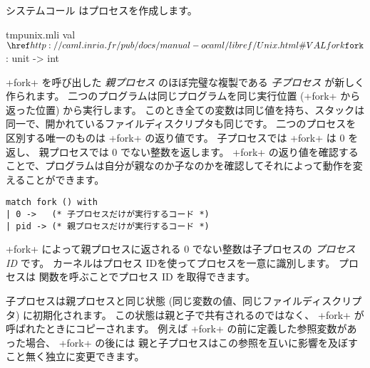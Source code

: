 システムコール  はプロセスを作成します。
%
\begin{listingcodefile}{tmpunix.mli}
val $\libvalue{Unix}{fork}$ : unit -> int
\end{listingcodefile}
%
\ml+fork+ を呼び出した \emph{親プロセス} のほぼ完璧な複製である \emph{子プロセス}
が新しく作られます。
二つのプログラムは同じプログラムを同じ実行位置 (\ml+fork+ から返った位置) から実行します。
このとき全ての変数は同じ値を持ち、スタックは同一で、開かれているファイルディスクリプタも同じです。
二つのプロセスを区別する唯一のものは \ml+fork+ の返り値です。
子プロセスでは \ml+fork+ は 0 を返し、 親プロセスでは 0 でない整数を返します。
\ml+fork+ の返り値を確認することで、プログラムは自分が親なのか子なのかを確認してそれによって動作を変えることができます。
%
\begin{lstlisting}
match fork () with
| 0 ->   (* 子プロセスだけが実行するコード *)
| pid -> (* 親プロセスだけが実行するコード *)
\end{lstlisting}
%
\ml+fork+ によって親プロセスに返される 0 でない整数は子プロセスの \emph{プロセス ID} です。
カーネルはプロセス IDを使ってプロセスを一意に識別します。
プロセスは  関数を呼ぶことでプロセス ID を取得できます。

子プロセスは親プロセスと同じ状態 (同じ変数の値、同じファイルディスクリプタ) に初期化されます。
この状態は親と子で共有されるのではなく、 \ml+fork+ が呼ばれたときにコピーされます。
例えば \ml+fork+ の前に定義した参照変数があった場合、 \ml+fork+ の後には
親と子プロセスはこの参照を互いに影響を及ぼすこと無く独立に変更できます。

